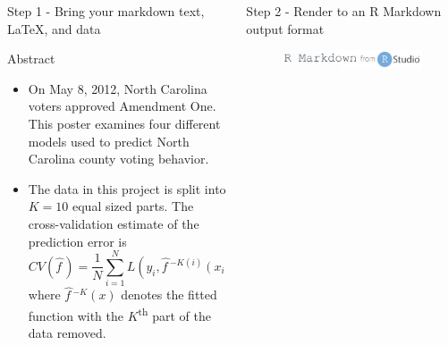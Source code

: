 \documentclass[final]{beamer}
\begin{document}
\begin{frame}[fragile]
\begin{columns}[t]
\begin{column}{0.31\linewidth}
\begin{minipage}[t][1.000\textheight]{\linewidth}
\begin{block}{Step 1 - Bring your markdown text, LaTeX, and data}
\end{block}
\vfill

\vspace{0ex}
\begin{block}{Abstract}
\begin{itemize}
\item On May 8, 2012, North Carolina voters approved Amendment One.  This poster examines four different models used to predict North Carolina county voting behavior.  
\item The data in this project is split into $K=10$ equal sized parts.  The cross-validation estimate of the prediction error is $$CV(\hat{f\,}\!)=\frac{1}{N}\sum_{i=1}^{N}L(y_i, \hat{f\,}\!^{-K(i)}(x_i)),$$
where $\hat{f\,}\!^{-K}(x)$ denotes the fitted function with the $K$\textsuperscript{th} part of the data removed.
\end{itemize}
\vspace{0ex}
\end{block}
\vfill

\end{minipage}
\end{column}%


\begin{column}{0.31\linewidth}
\begin{minipage}[t][.955\textheight]{\linewidth} 

\vspace{0ex}
\begin{block}{Step 2 - Render to an R Markdown output format}
\vspace{3ex}
\begin{figure}
\includegraphics[width=0.98\linewidth]{images/RMarkdown.png}
\end{figure}


\end{block}
\end{minipage}
\end{column}
\end{columns}
\end{frame}
\end{document}
